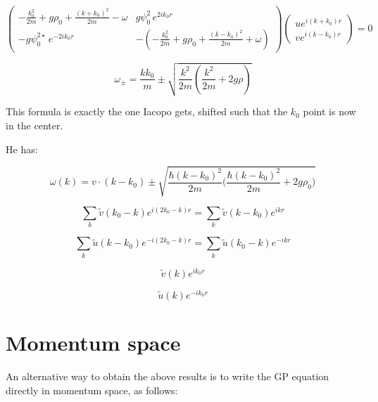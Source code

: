 \documentclass[a4paper,prb,10pt,aps]{revtex4-1}
\begin{document}
\begin{equation}
  \label{eq:18}
\left(\begin{array}{cc}
-\frac{k_{0}^{2}}{2m}+g\rho_{0}+\frac{(k+k_{0})^{2}}{2m}-\omega & g\psi_{0}^{2}\, e^{2ik_{0}r}\\
-g\psi_{0}^{2\star}\, e^{-2ik_{0}r} & -\left(-\frac{k_{0}^{2}}{2m}+g\rho_{0}+\frac{(k-k_{0})^{2}}{2m}+\omega\right)
\end{array}\right)\left(\begin{array}{c}
ue^{i(k+k_{0})r}\\
ve^{i(k-k_{0})r}
\end{array}\right)=0
\end{equation}



\begin{equation}
  \label{eq:19}
\omega_{\pm}=\frac{kk_{0}}{m}\pm\sqrt{\frac{k^{2}}{2m}\left(\frac{k^{2}}{2m}+2g\rho\right)}  
\end{equation}


This formula is exactly the one Iacopo gets, shifted such that the
$k_{0}$ point is now in the center.

He has:

\begin{equation}
  \label{eq:20}
\omega(k)=v\cdot(k-k_{0})\pm\sqrt{\frac{\hbar(k-k_{0})^{2}}{2m}\Big(\frac{\hbar(k-k_{0})^{2}}{2m}+2g\rho_{0}\Big)}  
\end{equation}


\begin{equation}
  \label{eq:21}
\sum_{k}\widetilde{v}(k_{0}-k)e^{i(2k_{0}-k)r}=\sum_{k}\widetilde{v}(k-k_{0})e^{ikr}  
\end{equation}

\begin{equation}
  \label{eq:22}
\sum_{k}\widetilde{u}(k-k_{0})e^{-i(2k_{0}-k)r}=\sum_{k}\widetilde{u}(k_{0}-k)e^{-ikr}  
\end{equation}

\begin{equation}
  \label{eq:23}
\widetilde{v}(k)e^{ik_{0}r}  
\end{equation}

\begin{equation}
  \label{eq:24}
\widetilde{u}(k)e^{-ik_{0}r}  
\end{equation}




\section{Momentum space}
\label{sec:momspc}
An alternative way to obtain the above results is to write the GP equation directly in momentum space, as follows:
\end{document}
